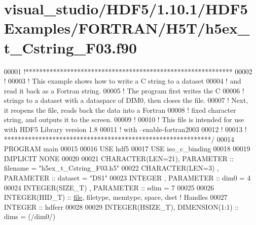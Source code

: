 \hypertarget{visual__studio_2_h_d_f5_21_810_81_2_h_d_f5_examples_2_f_o_r_t_r_a_n_2_h5_t_2h5ex__t___cstring___f03_8f90_source}{}\section{visual\+\_\+studio/\+H\+D\+F5/1.10.1/\+H\+D\+F5\+Examples/\+F\+O\+R\+T\+R\+A\+N/\+H5\+T/h5ex\+\_\+t\+\_\+\+Cstring\+\_\+\+F03.f90}
\label{visual__studio_2_h_d_f5_21_810_81_2_h_d_f5_examples_2_f_o_r_t_r_a_n_2_h5_t_2h5ex__t___cstring___f03_8f90_source}

\begin{DoxyCode}
00001 \textcolor{comment}{!************************************************************}
00002 \textcolor{comment}{!}
00003 \textcolor{comment}{!  This example shows how to write a C string to a dataset }
00004 \textcolor{comment}{!  and read it back as a Fortran string.}
00005 \textcolor{comment}{!  The program first writes the C }
00006 \textcolor{comment}{!  strings to a dataset with a dataspace of DIM0, then closes the file.}
00007 \textcolor{comment}{!  Next, it reopens the file, reads back the data into a Fortran}
00008 \textcolor{comment}{!  fixed character string, and outputs it to the screen.}
00009 \textcolor{comment}{!}
00010 \textcolor{comment}{!  This file is intended for use with HDF5 Library version 1.8}
00011 \textcolor{comment}{!  with --enable-fortran2003 }
00012 \textcolor{comment}{!}
00013 \textcolor{comment}{! ************************************************************/}
00014 \textcolor{keyword}{PROGRAM} main
00015 
00016   \textcolor{keywordtype}{USE }hdf5
00017   \textcolor{keywordtype}{USE }iso\_c\_binding
00018 
00019   \textcolor{keywordtype}{IMPLICIT NONE}
00020 
00021   \textcolor{keywordtype}{CHARACTER(LEN=21)}, \textcolor{keywordtype}{PARAMETER} :: filename  = \textcolor{stringliteral}{"h5ex\_t\_Cstring\_F03.h5"}
00022   \textcolor{keywordtype}{CHARACTER(LEN=3)} , \textcolor{keywordtype}{PARAMETER} :: dataset   = \textcolor{stringliteral}{"DS1"}
00023   \textcolor{keywordtype}{INTEGER}          , \textcolor{keywordtype}{PARAMETER} :: dim0      = 4
00024   \textcolor{keywordtype}{INTEGER(SIZE\_T)}  , \textcolor{keywordtype}{PARAMETER} :: sdim      = 7
00025 
00026   \textcolor{keywordtype}{INTEGER(HID\_T)}  :: \hyperlink{structfile}{file}, filetype, memtype, space, dset \textcolor{comment}{! Handles}
00027   \textcolor{keywordtype}{INTEGER} :: hdferr
00028 
00029   \textcolor{keywordtype}{INTEGER(HSIZE\_T)}, \textcolor{keywordtype}{DIMENSION(1:1)}   :: dims = (/dim0/)

\end{DoxyCode}
